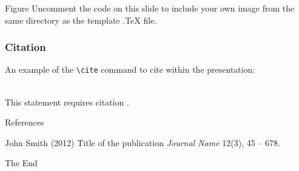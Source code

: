 \documentclass[aspectratio=169,xcolor=dvipsnames]{beamer}
\begin{document}

\begin{frame}{Figure}
  Uncomment the code on this slide to include your own image from the same directory as the template .TeX file.
\end{frame}


\begin{frame}[fragile] %
  \frametitle{Citation}
  An example of the \verb|\cite| command to cite within the presentation:\\~

  This statement requires citation \cite{p1}.
\end{frame}


\begin{frame}{References}
  \footnotesize{
    \begin{thebibliography}{99}
       John Smith (2012)
      \newblock Title of the publication
      \newblock \emph{Journal Name} 12(3), 45 -- 678.
    \end{thebibliography}
  }
\end{frame}


\begin{frame}
  \Huge{\centerline{The End}}
\end{frame}

\end{document}
